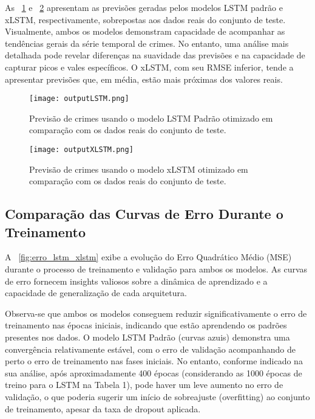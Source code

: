 \documentclass[conference]{IEEEtran}
\begin{document}
As \figurename~\ref{fig:lstm_plot} e \figurename~\ref{fig:xlstm_plot} apresentam as previsões geradas pelos modelos LSTM padrão e xLSTM, respectivamente, sobrepostas aos dados reais do conjunto de teste. Visualmente, ambos os modelos demonstram capacidade de acompanhar as tendências gerais da série temporal de crimes. No entanto, uma análise mais detalhada pode revelar diferenças na suavidade das previsões e na capacidade de capturar picos e vales específicos. O xLSTM, com seu RMSE inferior, tende a apresentar previsões que, em média, estão mais próximas dos valores reais.

\begin{figure}[htbp]
\centerline{\texttt{[image: outputLSTM.png]}}
\caption{Previsão de crimes usando o modelo LSTM Padrão otimizado em comparação com os dados reais do conjunto de teste.}
\label{fig:lstm_plot}
\end{figure}

\begin{figure}[htbp]
\centerline{\texttt{[image: outputXLSTM.png]}}
\caption{Previsão de crimes usando o modelo xLSTM otimizado em comparação com os dados reais do conjunto de teste.}
\label{fig:xlstm_plot}
\end{figure}

\subsection{Comparação das Curvas de Erro Durante o Treinamento}

A \figurename~\ref{fig:erro_lstm_xlstm} exibe a evolução do Erro Quadrático Médio (MSE) durante o processo de treinamento e validação para ambos os modelos. As curvas de erro fornecem insights valiosos sobre a dinâmica de aprendizado e a capacidade de generalização de cada arquitetura.

Observa-se que ambos os modelos conseguem reduzir significativamente o erro de treinamento nas épocas iniciais, indicando que estão aprendendo os padrões presentes nos dados. O modelo LSTM Padrão (curvas azuis) demonstra uma convergência relativamente estável, com o erro de validação acompanhando de perto o erro de treinamento nas fases iniciais. No entanto, conforme indicado na sua análise, após aproximadamente 400 épocas (considerando as 1000 épocas de treino para o LSTM na Tabela 1), pode haver um leve aumento no erro de validação, o que poderia sugerir um início de sobreajuste (overfitting) ao conjunto de treinamento, apesar da taxa de dropout aplicada.
\end{document}
